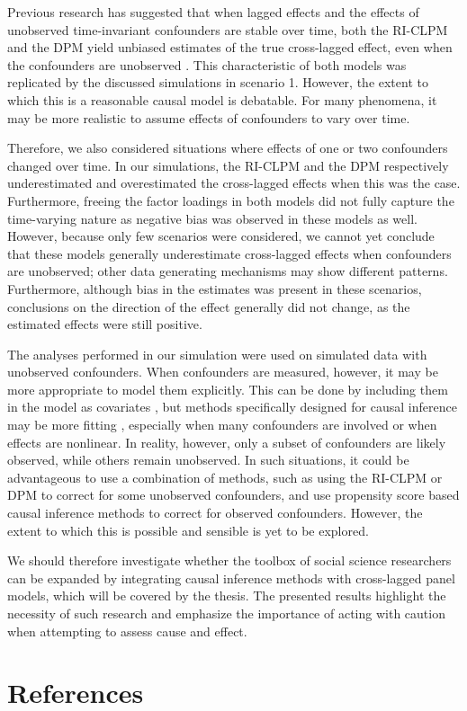 \documentclass[
  a4paper,
  stu,
  floatsintext,
  donotrepeattitle]{apa7}
\begin{document}
Previous research has suggested that when lagged effects and the effects
of unobserved time-invariant confounders are stable over time, both the
RI-CLPM and the DPM yield unbiased estimates of the true cross-lagged
effect, even when the confounders are unobserved
\autocite[e.g.][]{usami2019}. This characteristic of both models was
replicated by the discussed simulations in scenario 1. However, the
extent to which this is a reasonable causal model is debatable. For many
phenomena, it may be more realistic to assume effects of confounders to
vary over time.

Therefore, we also considered situations where effects of one or two
confounders changed over time. In our simulations, the RI-CLPM and the
DPM respectively underestimated and overestimated the cross-lagged
effects when this was the case. Furthermore, freeing the factor loadings
in both models did not fully capture the time-varying nature as negative
bias was observed in these models as well. However, because only few
scenarios were considered, we cannot yet conclude that these models
generally underestimate cross-lagged effects when confounders are
unobserved; other data generating mechanisms may show different
patterns. Furthermore, although bias in the estimates was present in
these scenarios, conclusions on the direction of the effect generally
did not change, as the estimated effects were still positive.

The analyses performed in our simulation were used on simulated data
with unobserved confounders. When confounders are measured, however, it
may be more appropriate to model them explicitly. This can be done by
including them in the model as covariates \autocite{mulder2021}, but
methods specifically designed for causal inference may be more fitting
\autocite{schafer2008a,leite2019}, especially when many confounders are
involved or when effects are nonlinear. In reality, however, only a
subset of confounders are likely observed, while others remain
unobserved. In such situations, it could be advantageous to use a
combination of methods, such as using the RI-CLPM or DPM to correct for
some unobserved confounders, and use propensity score based causal
inference methods to correct for observed confounders. However, the
extent to which this is possible and sensible is yet to be explored.

We should therefore investigate whether the toolbox of social science
researchers can be expanded by integrating causal inference methods with
cross-lagged panel models, which will be covered by the thesis. The
presented results highlight the necessity of such research and emphasize
the importance of acting with caution when attempting to assess cause
and effect.

\newpage{}

\hypertarget{references}{%
\section*{References}\label{references}}

\printbibliography[heading=none]
\end{document}
